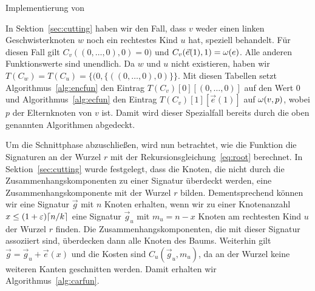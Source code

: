 \begin{algorithm}
    \caption{Implementierung von }\label{alg:ecfun}
    \begin{algorithmic}[1]
             
                \Return
            \Else
            \EndIf
        \EndFunction
    \end{algorithmic}
\end{algorithm}

\begin{rem}
    In Sektion~\ref{sec:cutting} haben wir den Fall, dass $v$ weder einen linken Geschwisterknoten $w$ noch ein rechtestes Kind $u$ hat, speziell behandelt.
    Für diesen Fall gilt $C_v((0,\ldots,0), 0) = 0)$ und $C_v(\vec{e}(1), 1) = \omega(e)$. 
    Alle anderen Funktionswerte sind unendlich.
    Da $w$ und $u$ nicht existieren, haben wir $T(C_w) = T(C_u) = \{(0, \{((0, \ldots, 0), 0)\} \}$.
    Mit diesen Tabellen setzt Algorithmus~\ref{alg:encfun} den Eintrag $T(C_v)[0][(0,\ldots, 0)]$ auf den Wert $0$ und Algorithmus~\ref{alg:ecfun} den Eintrag $T(C_v)[1][\vec{e}(1)]$ auf $\omega(v,p)$, wobei $p$ der Elternknoten von $v$ ist.
    Damit wird dieser Spezialfall bereits durch die oben genannten Algorithmen abgedeckt.
\end{rem}

Um die Schnittphase abzuschließen, wird nun betrachtet, wie die Funktion \carfun{} die Signaturen an der Wurzel $r$ mit der Rekursionsgleichung~\eqref{eq:root} berechnet.
In Sektion~\ref{sec:cutting} wurde festgelegt, dass die Knoten, die nicht durch die Zusammenhangskomponenten zu einer Signatur überdeckt werden, eine Zusammenhangskomponente mit der Wurzel $r$ bilden.
Dementsprechend können wir eine Signatur $\vec{g}$ mit $n$ Knoten erhalten, wenn wir zu einer Knotenanzahl $x \leq (1+\varepsilon)\lceil n/k\rceil$ eine Signatur $\vec{g}_u$ mit $m_u = n - x$ Knoten am rechtesten Kind $u$ der Wurzel $r$ finden.
Die Zusammenhangskomponenten, die mit dieser Signatur assoziiert sind, überdecken dann alle Knoten des Baums.
Weiterhin gilt $\vec{g} = \vec{g}_u + \vec{e}(x)$ und die Kosten sind $C_u(\vec{g}_u, m_u)$, da an der Wurzel keine weiteren Kanten geschnitten werden.
Damit erhalten wir Algorithmus~\ref{alg:carfun}.

